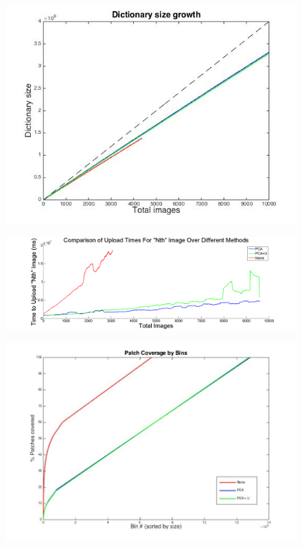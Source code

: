  \begin{figure}
\includegraphics[width=1\linewidth]{fig_NN/dict_growth.jpg}
\caption{}
\label{fig:dict_growth}
\end{figure}

 \begin{figure}
\includegraphics[width=1\linewidth]{Figures/upload_times.png}
\caption{}
\label{fig:upload_times}
\end{figure}

 \begin{figure}
\includegraphics[width=1\linewidth]{fig_NN/bin_cover.jpg}
\caption{}
\label{fig:bin_cover}
\end{figure}

